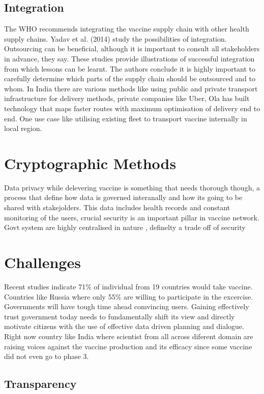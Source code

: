 \documentclass{article}
\begin{document}
 \subsection{Integration}
 The WHO recommends integrating the vaccine supply chain with other health supply chains. Yadav et al. (2014) study the possibilities of integration. Outsourcing can be beneficial, although it is important to consult all stakeholders in advance, they say. These studies provide illustrations of successful integration from which lessons can be learnt. The authors conclude it is highly important to carefully determine which parts of the supply chain should be outsourced and to whom.\cite{duijzer2018literature}
 In India there are various methods like using public and private transport infrastructure for delivery methods, private companies like Uber, Ola has built technology that maps faster routes with maximum optimisation of delivery end to end. One use case like utilising existing fleet to transport vaccine internally in local region.
\section{Cryptographic Methods}

Data privacy while delevering vaccine is something that needs thorough though, a process that define how data is governed interanally and how its going to be shared with stakejolders. This data includes health records and constant monitoring of the users, crucial security is an important pillar in vaccine network. Govt system are highly centralised in nature , definelty a trade off of security 
	
\section{Challenges}

Recent studies indicate 71\% of individual from 19 countries would take vaccine. Countries like Russia where only 55\% are willing to participate in the excercise. Governments will have tough time ahead comvincing users. Gaining effectively trust government today needs to fundamentally shift its view and directly motivate citizens with the use of effective data driven planning and dialogue. Right now country like India where scientist from all across diferent domain are raising voices against the vaccine production and its efficacy since some vaccine did not even go to phase 3. 

\subsection{Transparency}
\end{document}
